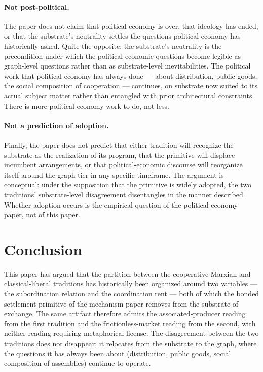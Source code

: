 \documentclass[11pt,a4paper]{article}
\theoremstyle{remark}
\begin{document}
\paragraph{Not post-political.}
The paper does not claim that political economy is over, that
ideology has ended, or that the substrate's neutrality settles
the questions political economy has historically asked. Quite
the opposite: the substrate's neutrality is the precondition
under which the political-economic questions become legible as
graph-level questions rather than as substrate-level
inevitabilities. The political work that political economy has
always done --- about distribution, public goods, the social
composition of cooperation --- continues, on substrate now
suited to its actual subject matter rather than entangled with
prior architectural constraints. There is more political-economy
work to do, not less.

\paragraph{Not a prediction of adoption.}
Finally, the paper does not predict that either tradition will
recognize the substrate as the realization of its program, that
the primitive will displace incumbent arrangements, or that
political-economic discourse will reorganize itself around the
graph tier in any specific timeframe. The argument is conceptual:
under the supposition that the primitive is widely adopted, the
two traditions' substrate-level disagreement disentangles in the
manner described. Whether adoption occurs is the empirical
question of the political-economy paper, not of this paper.

\section{Conclusion}
\label{sec:conclusion}

This paper has argued that the partition between the
cooperative-Marxian and classical-liberal traditions has
historically been organized around two variables --- the
subordination relation and the coordination rent --- both of
which the bonded settlement primitive
of the mechanism paper removes from the substrate of
exchange. The same artifact therefore admits the
associated-producer reading from the first tradition and the
frictionless-market reading from the second, with neither
reading requiring metaphorical license. The disagreement between
the two traditions does not disappear; it relocates from the
substrate to the graph, where the questions it has always been
about (distribution, public goods, social composition of
assemblies) continue to operate.
\end{document}
